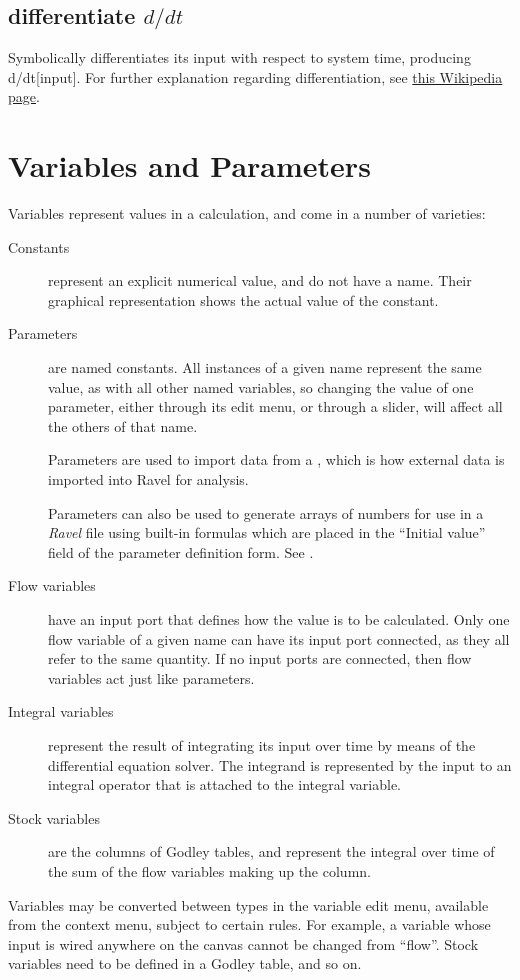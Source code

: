 \subsection{differentiate $d/dt$}


\label{Operation:differentiate} Symbolically differentiates its input
with respect to system time, producing d/dt{[}input{]}. For further
explanation regarding differentiation, see \href{https://en.wikipedia.org/wiki/Derivative}{this Wikipedia page}.


\section{Variables and Parameters}

\label{Variables}\label{Variable:constant}\label{VarConstant}\label{Variable:parameter}
\label{Variable:flow}\label{Variable:integral}\label{Variable:stock}


Variables represent values in a calculation, and come in a number
of varieties: 
\begin{description}
\item [{Constants}] represent an explicit numerical value, and do not have
a name. Their graphical representation shows the actual value of the
constant. 
\item [{Parameters}] are named constants. All instances of a given name
represent the same value, as with all other named variables, so changing
the value of one parameter, either through its edit menu, or through
a slider, will affect all the others of that name.

Parameters are used to import data from a ,
which is how external data is imported into Ravel for analysis.

Parameters can also be used to generate arrays of numbers for
use in a \emph{Ravel} file using built-in formulas which are placed
in the ``Initial value'' field of the parameter definition form.
See .
\item [{Flow variables}] have an input port that defines how the value
is to be calculated. Only one flow variable of a given name can have
its input port connected, as they all refer to the same quantity.
If no input ports are connected, then flow variables act just like
parameters. 
\item [{Integral variables}] represent the result of integrating its input
over time by means of the differential equation solver. The integrand
is represented by the input to an integral operator that is attached
to the integral variable. 
\item [{Stock variables}] are the columns of Godley tables, and represent
the integral over time of the sum of the flow variables making up
the column. 
\end{description}
Variables may be converted between types in the variable edit menu,
available from the context menu, subject to certain rules. For example,
a variable whose input is wired anywhere on the canvas cannot be changed
from ``flow''. Stock variables need to be defined in a Godley table,
and so on.

